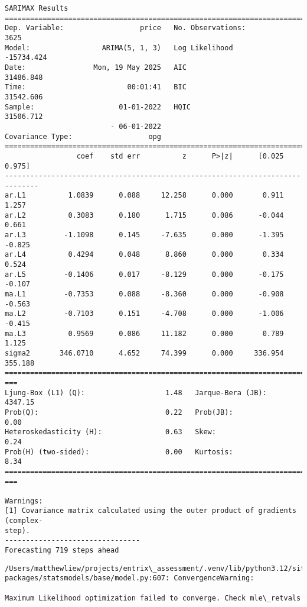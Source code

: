 \documentclass[11pt]{article}
\begin{document}
    \begin{Verbatim}[commandchars=\\\{\}]
                               SARIMAX Results
==============================================================================
Dep. Variable:                  price   No. Observations:                 3625
Model:                 ARIMA(5, 1, 3)   Log Likelihood              -15734.424
Date:                Mon, 19 May 2025   AIC                          31486.848
Time:                        00:01:41   BIC                          31542.606
Sample:                    01-01-2022   HQIC                         31506.712
                         - 06-01-2022
Covariance Type:                  opg
==============================================================================
                 coef    std err          z      P>|z|      [0.025      0.975]
------------------------------------------------------------------------------
ar.L1          1.0839      0.088     12.258      0.000       0.911       1.257
ar.L2          0.3083      0.180      1.715      0.086      -0.044       0.661
ar.L3         -1.1098      0.145     -7.635      0.000      -1.395      -0.825
ar.L4          0.4294      0.048      8.860      0.000       0.334       0.524
ar.L5         -0.1406      0.017     -8.129      0.000      -0.175      -0.107
ma.L1         -0.7353      0.088     -8.360      0.000      -0.908      -0.563
ma.L2         -0.7103      0.151     -4.708      0.000      -1.006      -0.415
ma.L3          0.9569      0.086     11.182      0.000       0.789       1.125
sigma2       346.0710      4.652     74.399      0.000     336.954     355.188
================================================================================
===
Ljung-Box (L1) (Q):                   1.48   Jarque-Bera (JB):
4347.15
Prob(Q):                              0.22   Prob(JB):
0.00
Heteroskedasticity (H):               0.63   Skew:
0.24
Prob(H) (two-sided):                  0.00   Kurtosis:
8.34
================================================================================
===

Warnings:
[1] Covariance matrix calculated using the outer product of gradients (complex-
step).
--------------------------------
Forecasting 719 steps ahead
    \end{Verbatim}

    \begin{Verbatim}[commandchars=\\\{\}]
/Users/matthewliew/projects/entrix\_assessment/.venv/lib/python3.12/site-
packages/statsmodels/base/model.py:607: ConvergenceWarning:

Maximum Likelihood optimization failed to converge. Check mle\_retvals

    \end{Verbatim}
\end{document}
